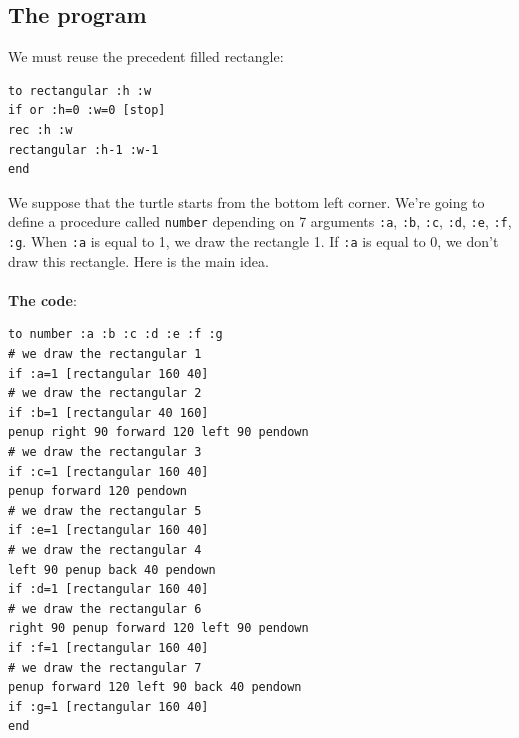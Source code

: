 \subsection{The program}
\noindent We must reuse the precedent filled rectangle:
\begin{verbatim}
to rectangular :h :w
if or :h=0 :w=0 [stop]
rec :h :w
rectangular :h-1 :w-1
end
\end{verbatim}
We suppose that the turtle starts from the bottom left corner. We're going to define a procedure called \texttt{number} depending on 7 arguments \texttt{:a}, \texttt{:b}, \texttt{:c}, \texttt{:d}, \texttt{:e}, \texttt{:f}, \texttt{:g}. When \texttt{:a} is equal to 1, we draw the rectangle 1. If \texttt{:a} is equal to 0, we don't draw this rectangle. Here is the main idea.\\ \\
\textbf{The code}:
\begin{verbatim}
to number :a :b :c :d :e :f :g
# we draw the rectangular 1
if :a=1 [rectangular 160 40]
# we draw the rectangular 2
if :b=1 [rectangular 40 160]
penup right 90 forward 120 left 90 pendown
# we draw the rectangular 3
if :c=1 [rectangular 160 40]
penup forward 120 pendown
# we draw the rectangular 5
if :e=1 [rectangular 160 40]
# we draw the rectangular 4
left 90 penup back 40 pendown
if :d=1 [rectangular 160 40]
# we draw the rectangular 6
right 90 penup forward 120 left 90 pendown
if :f=1 [rectangular 160 40]
# we draw the rectangular 7
penup forward 120 left 90 back 40 pendown 
if :g=1 [rectangular 160 40]
end

\end{verbatim}
